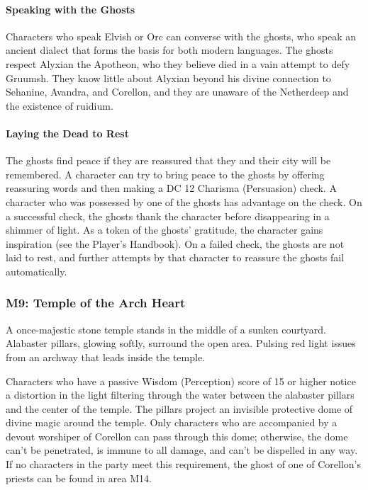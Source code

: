 \documentclass[10pt,a4paper,twoside,bg=print,twocolumn,openany,nodeprecatedcode]{dndbook}
\begin{document}
\paragraph{Speaking with the Ghosts}
Characters who speak Elvish or Orc can converse with the ghosts, who speak an ancient dialect that forms the basis for both modern languages. The ghosts respect Alyxian the Apotheon, who they believe died in a vain attempt to defy Gruumsh. They know little about Alyxian beyond his divine connection to Sehanine, Avandra, and Corellon, and they are unaware of the Netherdeep and the existence of ruidium.

\paragraph{Laying the Dead to Rest}
The ghosts find peace if they are reassured that they and their city will be remembered. A character can try to bring peace to the ghosts by offering reassuring words and then making a DC 12 Charisma (Persuasion) check. A character who was possessed by one of the ghosts has advantage on the check. On a successful check, the ghosts thank the character before disappearing in a shimmer of light. As a token of the ghosts' gratitude, the character gains inspiration (see the Player's Handbook). On a failed check, the ghosts are not laid to rest, and further attempts by that character to reassure the ghosts fail automatically.



\subsubsection{M9: Temple of the Arch Heart}
\begin{DndReadAloud}{}
A once-majestic stone temple stands in the middle of a sunken courtyard. Alabaster pillars, glowing softly, surround the open area. Pulsing red light issues from an archway that leads inside the temple.

\end{DndReadAloud}

Characters who have a passive Wisdom (Perception) score of 15 or higher notice a distortion in the light filtering through the water between the alabaster pillars and the center of the temple. The pillars project an invisible protective dome of divine magic around the temple. Only characters who are accompanied by a devout worshiper of Corellon can pass through this dome; otherwise, the dome can't be penetrated, is immune to all damage, and can't be dispelled in any way. If no characters in the party meet this requirement, the ghost of one of Corellon's priests can be found in area M14.
\end{document}
